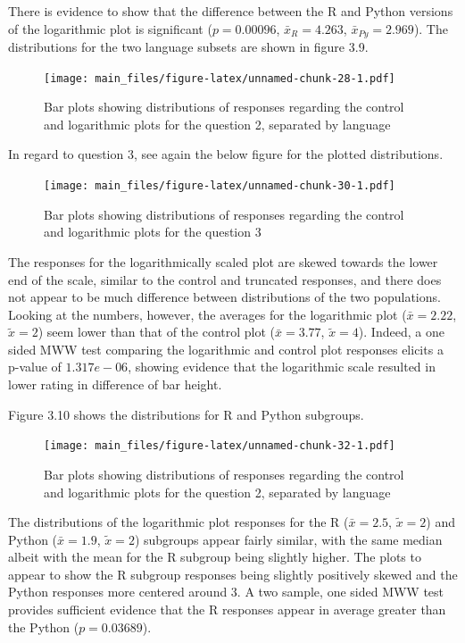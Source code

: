 \documentclass[
  11pt,
]{book}
\begin{document}
There is evidence to show that the difference between the R and Python
versions of the logarithmic plot is significant (\(p=0.00096\),
\(\bar{x}_R = 4.263\), \(\bar{x}_{Py} = 2.969\)). The distributions for
the two language subsets are shown in figure 3.9.

\begin{figure}
\centering
\texttt{[image: main\_files/figure-latex/unnamed-chunk-28-1.pdf]}
\caption{Bar plots showing distributions of responses regarding the
control and logarithmic plots for the question 2, separated by language}
\end{figure}

In regard to question 3, see again the below figure for the plotted
distributions.

\begin{figure}
\centering
\texttt{[image: main\_files/figure-latex/unnamed-chunk-30-1.pdf]}
\caption{Bar plots showing distributions of responses regarding the
control and logarithmic plots for the question 3}
\end{figure}

The responses for the logarithmically scaled plot are skewed towards the
lower end of the scale, similar to the control and truncated responses,
and there does not appear to be much difference between distributions of
the two populations. Looking at the numbers, however, the averages for
the logarithmic plot (\(\bar{x}=2.22\), \(\tilde{x}=2\)) seem lower than
that of the control plot (\(\bar{x}=3.77\), \(\tilde{x}=4\)). Indeed, a
one sided MWW test comparing the logarithmic and control plot responses
elicits a p-value of \(1.317e-06\), showing evidence that the
logarithmic scale resulted in lower rating in difference of bar height.

Figure 3.10 shows the distributions for R and Python subgroups.

\begin{figure}
\centering
\texttt{[image: main\_files/figure-latex/unnamed-chunk-32-1.pdf]}
\caption{Bar plots showing distributions of responses regarding the
control and logarithmic plots for the question 2, separated by language}
\end{figure}

The distributions of the logarithmic plot responses for the R
(\(\bar{x}=2.5\), \(\tilde{x}=2\)) and Python (\(\bar{x}=1.9\),
\(\tilde{x}=2\)) subgroups appear fairly similar, with the same median
albeit with the mean for the R subgroup being slightly higher. The plots
to appear to show the R subgroup responses being slightly positively
skewed and the Python responses more centered around 3. A two sample,
one sided MWW test provides sufficient evidence that the R responses
appear in average greater than the Python (\(p=0.03689\)).
\end{document}
